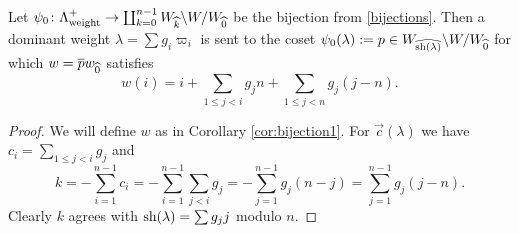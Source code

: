 \begin{theorem} \label{thm:explicitpermutation} Let $\psi_0 \colon \Lambda^+_{\operatorname{weight}} \to \coprod_{k=0}^{n-1} W_{\widehat{k}} \backslash W / W_{\widehat{0}}$ be the bijection from \eqref{bijections}. Then a dominant weight $\lambda = \sum g_i \varpi_i$ is sent to the coset $\psi_0(\lambda) := p \in W_{\widehat{\operatorname{sh}(\lambda)}} \backslash W / W_{\widehat{0}}$ for which $w = \overline{p} w_{\widehat{0}}$ satisfies
\begin{equation} w(i) = i + \sum_{1 \le j<i} g_j n + \sum_{1 \le j < n} g_j(j-n). \end{equation}
\end{theorem}

\begin{proof} We will define $w$ as in Corollary \ref{cor:bijection1}. For $\vec{c}(\lambda)$ we have $c_i = \sum_{1 \le j < i} g_j$ and
\begin{equation} k = - \sum_{i=1}^{n-1} c_i = - \sum_{i=1}^{n-1} \sum_{j<i} g_j = - \sum_{j=1}^{n-1} g_j (n-j) = \sum_{j=1}^{n-1} g_j(j-n).  \end{equation}
Clearly $k$ agrees with $\operatorname{sh}(\lambda) = \sum g_j j$ modulo $n$.
\end{proof}






